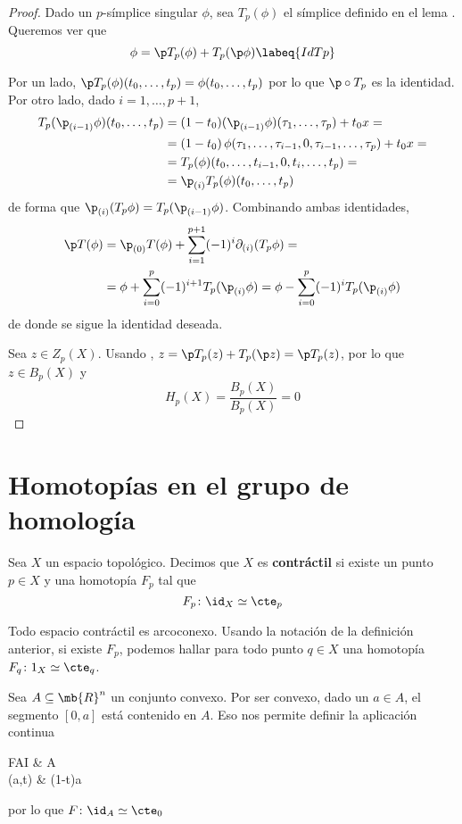 \begin{proof}
Dado un $p$-símplice singular $\phi$, sea $T_p(\phi)$ el símplice definido en el
lema . Queremos ver que
\begin{equation}
\phi=\p T_p(\phi)+T_p(\p \phi) \labeq{IdTp}
\end{equation}

Por un lado, $\p T_p(\phi)(t_0,\dots,t_p)=\phi(t_0,\dots,t_p)$ por lo que
$\p\circ T_p$ es la identidad. Por otro lado, dado $i=1,\dots,p+1$,
\begin{align*}
T_p(\p_{(i-1)}\phi)(t_0,\dots,t_p)
	&=(1-t_0)(\p_{(i-1)}\phi)(\tau_1,\dots,\tau_p)+t_0x=\\
	&=(1-t_0)\,\phi(\tau_1,\dots,\tau_{i-1},0,\tau_{i-1},\dots,\tau_p)+t_0x=\\
	&=T_p(\phi)(t_0,\dots,t_{i-1},0,t_i,\dots,t_p)=\\
	&=\p_{(i)}T_p(\phi)(t_0,\dots,t_p)
\end{align*}
de forma que $\p_{(i)}(T_p\phi)=T_p(\p_{(i-1)}\phi)$. Combinando ambas identidades,
\begin{align*}
\p T(\phi)
	&=\p_{(0)}T(\phi)+\sum^{p+1}_{i=1}(-1)^i\partial_{(i)}(T_p\phi)=\\
	&=\phi+\sum^p_{i=0}(-1)^{i+1}T_p(\p_{(i)}\phi)=
	\phi-\sum^p_{i=0}(-1)^iT_p(\p_{(i)}\phi)
\end{align*}
de donde se sigue la identidad deseada.

Sea $z \in Z_p(X)$. Usando , $z=\p T_p(z)+T_p(\p z)=\p T_p(z)$,
por lo que $z \in B_p(X)$ y
\[H_p(X)=\frac{B_p(X)}{B_p(X)}=0\]
\end{proof}

\section{Homotopías en el grupo de homología}
\begin{defn}
Sea $X$ un espacio topológico. Decimos que $X$ es \textbf{contráctil} si existe un
punto $p \in X$ y una homotopía $F_p$ tal que
\[F_p\colon \id_X \simeq \cte_p\]
\end{defn}

\begin{proposition}
Todo espacio contráctil es arcoconexo. Usando la notación de la definición
anterior, si existe $F_p$, podemos hallar para todo punto $q \in X$ una homotopía
$F_q\colon 1_X \simeq \cte_q$.
\end{proposition}

\begin{example}
Sea $A \subseteq \mb{R}^n$ un conjunto convexo. Por ser convexo, dado un $a \in
A$, el segmento $[0,a]$ está contenido en $A$. Eso nos permite definir la
aplicación continua
\begin{diag}
F\colon A\times I \arrow[r] & A                      \\[-0.8cm]
(a,t) \arrow[r, maps to]      & (1-t)a
\end{diag}
por lo que $F\colon \id_A \simeq \cte_0$
\end{example}

